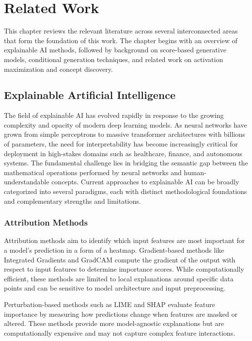 \chapter{Related Work}\label{r:related_work}

This chapter reviews the relevant literature across several interconnected areas that form the foundation of this work. The chapter begins with an overview of explainable AI methods, followed by background on score-based generative models, conditional generation techniques, and related work on activation maximization and concept discovery.

\section{Explainable Artificial Intelligence}

The field of explainable AI has evolved rapidly in response to the growing complexity and opacity of modern deep learning models. As neural networks have grown from simple perceptrons to massive transformer architectures with billions of parameters, the need for interpretability has become increasingly critical for deployment in high-stakes domains such as healthcare, finance, and autonomous systems. The fundamental challenge lies in bridging the semantic gap between the mathematical operations performed by neural networks and human-understandable concepts. Current approaches to explainable AI can be broadly categorized into several paradigms, each with distinct methodological foundations and complementary strengths and limitations.

\subsection{Attribution Methods}

Attribution methods aim to identify which input features are most important for a model's prediction in a form of a heatmap. Gradient-based methods like Integrated Gradients \citep{sundararajan2017axiomaticattributiondeepnetworks} and GradCAM \citep{8237336} compute the gradient of the output with respect to input features to determine importance scores. While computationally efficient, these methods are limited to local explanations around specific data points and can be sensitive to model architecture and input preprocessing.

Perturbation-based methods such as LIME \citep{ribeiro2016whyitrustyou} and SHAP \citep{lundberg2017unifiedapproachinterpretingmodel} evaluate feature importance by measuring how predictions change when features are masked or altered. These methods provide more model-agnostic explanations but are computationally expensive and may not capture complex feature interactions.

